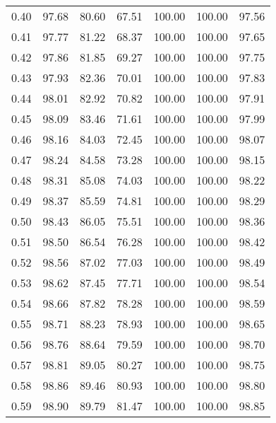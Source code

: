 \begin{tabular}{|c|c|c|c|c|c|c|}
      0.40 &     97.68 &     80.60 &      67.51 &  100.00 &     100.00 &         97.56 \\
      0.41 &     97.77 &     81.22 &      68.37 &  100.00 &     100.00 &         97.65 \\
      0.42 &     97.86 &     81.85 &      69.27 &  100.00 &     100.00 &         97.75 \\
      0.43 &     97.93 &     82.36 &      70.01 &  100.00 &     100.00 &         97.83 \\
      0.44 &     98.01 &     82.92 &      70.82 &  100.00 &     100.00 &         97.91 \\
      0.45 &     98.09 &     83.46 &      71.61 &  100.00 &     100.00 &         97.99 \\
      0.46 &     98.16 &     84.03 &      72.45 &  100.00 &     100.00 &         98.07 \\
      0.47 &     98.24 &     84.58 &      73.28 &  100.00 &     100.00 &         98.15 \\
      0.48 &     98.31 &     85.08 &      74.03 &  100.00 &     100.00 &         98.22 \\
      0.49 &     98.37 &     85.59 &      74.81 &  100.00 &     100.00 &         98.29 \\
      0.50 &     98.43 &     86.05 &      75.51 &  100.00 &     100.00 &         98.36 \\
      0.51 &     98.50 &     86.54 &      76.28 &  100.00 &     100.00 &         98.42 \\
      0.52 &     98.56 &     87.02 &      77.03 &  100.00 &     100.00 &         98.49 \\
      0.53 &     98.62 &     87.45 &      77.71 &  100.00 &     100.00 &         98.54 \\
      0.54 &     98.66 &     87.82 &      78.28 &  100.00 &     100.00 &         98.59 \\
      0.55 &     98.71 &     88.23 &      78.93 &  100.00 &     100.00 &         98.65 \\
      0.56 &     98.76 &     88.64 &      79.59 &  100.00 &     100.00 &         98.70 \\
      0.57 &     98.81 &     89.05 &      80.27 &  100.00 &     100.00 &         98.75 \\
      0.58 &     98.86 &     89.46 &      80.93 &  100.00 &     100.00 &         98.80 \\
      0.59 &     98.90 &     89.79 &      81.47 &  100.00 &     100.00 &         98.85 \\

\end{tabular}

